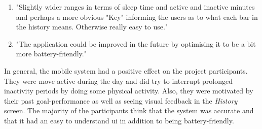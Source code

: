 \begin{itemize}
\begin{enumerate}
        \item "Slightly wider ranges in terms of sleep time and active and inactive minutes and perhaps a more obvious "Key" informing the users as to what each bar in the history means. Otherwise really easy to use."
        \item "The application could be improved in the future by optimising it to be a bit more battery-friendly."
    \end{enumerate}
\end{itemize}

In general, the mobile system had a positive effect on the project participants. They were move active during the day and did try to interrupt prolonged inactivity periods by doing some physical activity. Also, they were motivated by their past goal-performance as well as seeing visual feedback in the \textit{History} screen. The majority of the participants think that the system was accurate and that it had an easy to understand \gls{ui} in addition to being battery-friendly. 

